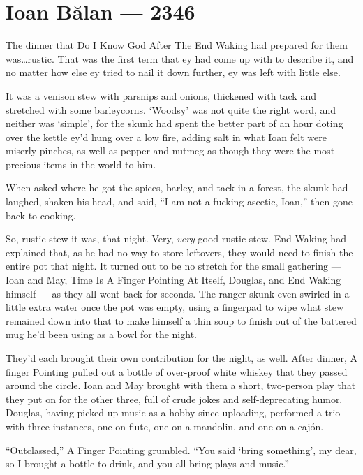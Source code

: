 \hypertarget{ioan-bux103lan-2346}{%
\chapter{Ioan Bălan — 2346}\label{ioan-bux103lan-2346}}

The dinner that Do I Know God After The End Waking had prepared for them was\ldots rustic. That was the first term that ey had come up with to describe it, and no matter how else ey tried to nail it down further, ey was left with little else.

It was a venison stew with parsnips and onions, thickened with tack and stretched with some barleycorns. `Woodsy' was not quite the right word, and neither was `simple', for the skunk had spent the better part of an hour doting over the kettle ey'd hung over a low fire, adding salt in what Ioan felt were miserly pinches, as well as pepper and nutmeg as though they were the most precious items in the world to him.

When asked where he got the spices, barley, and tack in a forest, the skunk had laughed, shaken his head, and said, ``I am not a fucking ascetic, Ioan,'' then gone back to cooking.

So, rustic stew it was, that night. Very, \emph{very} good rustic stew. End Waking had explained that, as he had no way to store leftovers, they would need to finish the entire pot that night. It turned out to be no stretch for the small gathering — Ioan and May, Time Is A Finger Pointing At Itself, Douglas, and End Waking himself — as they all went back for seconds. The ranger skunk even swirled in a little extra water once the pot was empty, using a fingerpad to wipe what stew remained down into that to make himself a thin soup to finish out of the battered mug he'd been using as a bowl for the night.

They'd each brought their own contribution for the night, as well. After dinner, A finger Pointing pulled out a bottle of over-proof white whiskey that they passed around the circle. Ioan and May brought with them a short, two-person play that they put on for the other three, full of crude jokes and self-deprecating humor. Douglas, having picked up music as a hobby since uploading, performed a trio with three instances, one on flute, one on a mandolin, and one on a cajón.

``Outclassed,'' A Finger Pointing grumbled. ``You said `bring something', my dear, so I brought a bottle to drink, and you all bring plays and music.''

